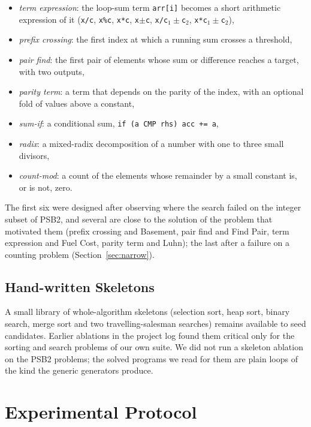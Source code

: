 \documentclass[sigconf,nonacm]{acmart}
\begin{document}
\begin{itemize}
  \item \emph{term expression}: the loop-sum term \texttt{arr[i]} becomes a short arithmetic expression of it (\texttt{x/c}, \texttt{x\%c}, \texttt{x*c}, \texttt{x$\pm$c}, \texttt{x/c$_1\pm$c$_2$}, \texttt{x*c$_1\pm$c$_2$}),
  \item \emph{prefix crossing}: the first index at which a running sum crosses a threshold,
  \item \emph{pair find}: the first pair of elements whose sum or difference reaches a target, with two outputs,
  \item \emph{parity term}: a term that depends on the parity of the index, with an optional fold of values above a constant,
  \item \emph{sum-if}: a conditional sum, \texttt{if (a CMP rhs) acc += a},
  \item \emph{radix}: a mixed-radix decomposition of a number with one to three small divisors,
  \item \emph{count-mod}: a count of the elements whose remainder by a small constant is, or is not, zero.
\end{itemize}
The first six were designed after observing where the search failed on the integer subset of PSB2, and several are close to the solution of the problem that motivated them (prefix crossing and Basement, pair find and Find Pair, term expression and Fuel Cost, parity term and Luhn); the last after a failure on a counting problem (Section~\ref{sec:narrow}).

\subsection{Hand-written Skeletons}
\label{sec:skeletons}
A small library of whole-algorithm skeletons (selection sort, heap sort, binary search, merge sort and two travelling-salesman searches) remains
available to seed candidates. Earlier ablations in the project log found them critical only for the sorting and search problems of our own suite. We did not run a
skeleton ablation on the PSB2 problems; the solved programs we read for them are plain loops of the kind the generic generators produce.

\section{Experimental Protocol}
\label{sec:protocol}
\end{document}
